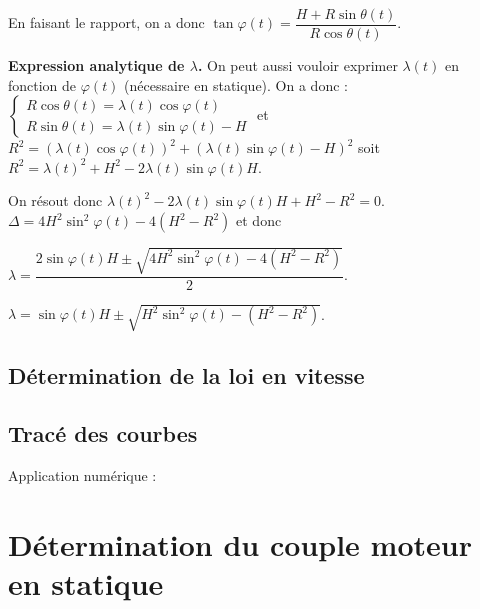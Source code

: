 En faisant le rapport, on a donc $\tan\varphi(t)=\dfrac{H+R\sin\theta(t)}{R\cos\theta(t)}$.



\textbf{Expression analytique de $\lambda$.}
On peut aussi vouloir exprimer $\lambda(t)$ en fonction de $\varphi(t)$ (nécessaire en statique). On a donc :
$\left\{
\begin{array}{l}
R\cos\theta(t) = \lambda(t) \cos\varphi(t)\\
R\sin\theta(t) =\lambda(t)\sin\varphi(t) - H
\end{array} 
\right.$
et $R^2  = \left( \lambda(t) \cos\varphi(t) \right)^2 + \left(\lambda(t)\sin\varphi(t) - H\right)^2$ soit
$R^2  =  \lambda(t)^2+H^2 -2\lambda(t)\sin\varphi(t)  H $.

On résout donc  $ \lambda(t)^2 -2\lambda(t)\sin\varphi(t)  H +H^2 - R^2 = 0$.
$\Delta =  4H^2\sin^2\varphi(t)  -4\left(H^2 - R^2 \right)$ 
 et donc
 
 $\lambda = \dfrac{2\sin\varphi(t) H \pm \sqrt{4H^2\sin^2\varphi(t)  -4\left(H^2 - R^2\right)}}{2}$.
 
 $\lambda = \sin\varphi(t) H \pm \sqrt{H^2\sin^2\varphi(t)  -\left(H^2 - R^2\right)}$.


\subsection{Détermination de la loi en vitesse}



\subsection{Tracé des courbes} 
Application numérique : 

%


\section{Détermination du couple moteur en statique}


